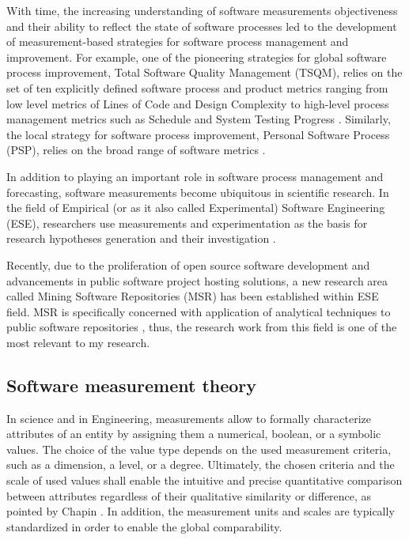 With time, the increasing understanding of software measurements objectiveness and their ability to reflect 
the state of software processes led to the development of measurement-based strategies for software 
process management and improvement. 
For example, one of the pioneering strategies for global software process improvement, 
Total Software Quality Management (TSQM), relies on the set of ten explicitly defined software 
process and product metrics ranging from low level metrics of Lines of Code and Design Complexity to 
high-level process management metrics such as Schedule and System Testing Progress \cite{citeulike:13071448}.
Similarly, the local strategy for software process improvement, Personal Software Process (PSP), relies on 
the broad range of software metrics \cite{citeulike:13072239}.

In addition to playing an important role in software process management and forecasting, software 
measurements become ubiquitous in scientific research. 
In the field of Empirical (or as it also called Experimental) Software Engineering (ESE), 
researchers use measurements and experimentation as the basis for research hypotheses 
generation and their investigation \cite{citeulike:766768}. 

Recently, due to the proliferation of open source software development and advancements in public software
project hosting solutions, a new research area called Mining Software Repositories (MSR) has been established 
within ESE field. MSR is specifically concerned with application of analytical techniques to public software 
repositories \cite{citeulike:12550438} \cite{citeulike:4534888} \cite{citeulike:2710928}, thus, 
the research work from this field is one of the most relevant to my research.

\subsection{Software measurement theory}
In science and in Engineering, measurements allow to formally characterize attributes of an entity by assigning 
them a numerical, boolean, or a symbolic values. 
The choice of the value type depends on the used measurement criteria, such as a dimension, a level, 
or a degree. Ultimately, the chosen criteria and the scale of used values shall enable the intuitive 
and precise quantitative comparison between attributes regardless of their qualitative similarity or 
difference, as pointed by Chapin \cite{citeulike:13158806}. 
In addition, the measurement units and scales are typically standardized in order to enable the global comparability.

